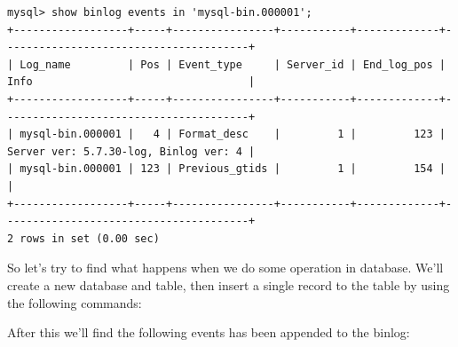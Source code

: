 \documentclass[12pt]{article}
\begin{document}
\begin{verbatim}
mysql> show binlog events in 'mysql-bin.000001';
+------------------+-----+----------------+-----------+-------------+---------------------------------------+
| Log_name         | Pos | Event_type     | Server_id | End_log_pos | Info                                  |
+------------------+-----+----------------+-----------+-------------+---------------------------------------+
| mysql-bin.000001 |   4 | Format_desc    |         1 |         123 | Server ver: 5.7.30-log, Binlog ver: 4 |
| mysql-bin.000001 | 123 | Previous_gtids |         1 |         154 |                                       |
+------------------+-----+----------------+-----------+-------------+---------------------------------------+
2 rows in set (0.00 sec)
\end{verbatim}

So let's try to find what happens when we do some operation in database. We'll create a new database and table, then insert a single record to the table by using the following commands:

\begin{Shaded}
\begin{Highlighting}[]
 
 
         \NormalTok{,}
\NormalTok{(}\NormalTok{)}
\NormalTok{);}
 \NormalTok{(}\NormalTok{, }\NormalTok{);}
\end{Highlighting}
\end{Shaded}

After this we'll find the following events has been appended to the binlog:
\end{document}
